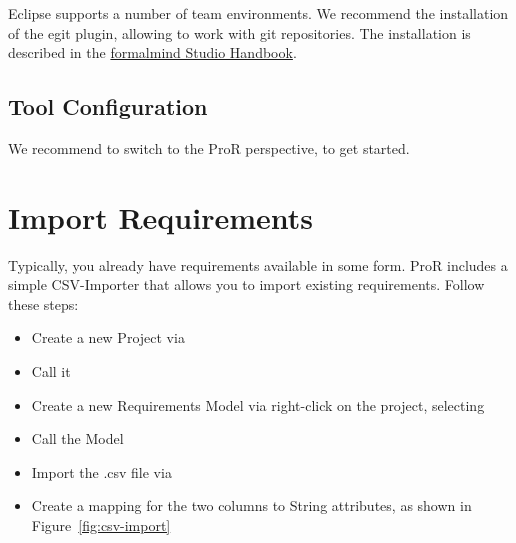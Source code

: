 Eclipse supports a number of team environments.  We recommend the installation of the egit plugin, allowing to work with git repositories.  The installation is described in the \href{http://formalmind.com/handbook?page=sec-versioning.html}{formalmind Studio Handbook}.

\subsection{Tool Configuration}

We recommend to switch to the ProR perspective, to get started.

\section{Import Requirements}

Typically, you already have requirements available in some form.  ProR includes a simple CSV-Importer that allows you to import existing requirements.  Follow these steps:

\begin{itemize}
\item Create a new Project via 
\item Call it 
\item Create a new Requirements Model via right-click on the project, selecting 
\item Call the Model 
\item Import the .csv file via 
\item Create a mapping for the two columns to String attributes, as shown in Figure~\ref{fig:csv-import}
\end{itemize}


